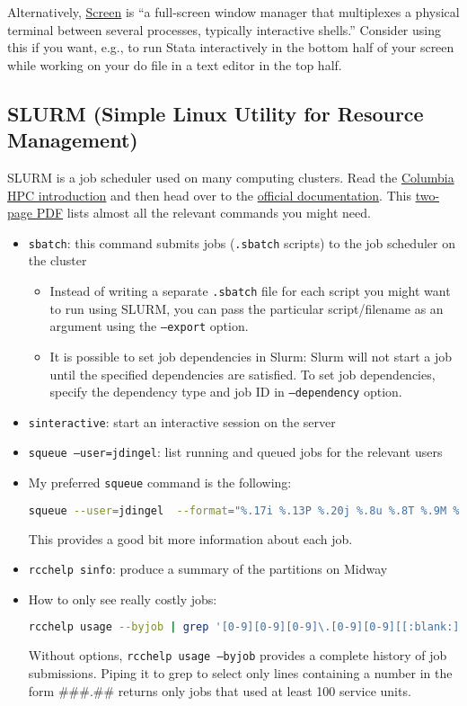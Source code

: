 Alternatively, 
\href{https://www.gnu.org/software/screen/manual/}{Screen} is ``a full-screen window manager that multiplexes a physical terminal between several processes, typically interactive shells.''
Consider using this if you want, e.g., to run Stata interactively in the bottom half of your screen while working on your do file in a text editor in the top half.


\subsection{SLURM (Simple Linux Utility for Resource Management)}

SLURM is a job scheduler used on many computing clusters.
Read the \href{https://columbiauniversity.atlassian.net/wiki/spaces/rcs/pages/62145134/Insomnia+-+Submitting+Jobs}{Columbia HPC introduction} and then head over to the \href{https://slurm.schedmd.com/overview.html}{official documentation}.
This \href{https://slurm.schedmd.com/pdfs/summary.pdf}{two-page PDF} lists almost all the relevant commands you might need.

\begin{itemize}
	\item \texttt{sbatch}: this command submits jobs (\texttt{.sbatch} scripts) to the job scheduler on the cluster
	\begin{itemize}
		\item Instead of writing a separate \texttt{.sbatch} file for each script you might want to run using SLURM, you can pass the particular script/filename as an argument using the \texttt{--export} option.
		\item It is possible to set job dependencies in Slurm: 
		Slurm will not start a job until the specified dependencies are satisfied.
		To set job dependencies, specify the dependency type and job ID in \texttt{--dependency} option.
	\end{itemize}
	\item \texttt{sinteractive}: start an interactive session on the server
	\item \texttt{squeue --user=jdingel}: list running and queued jobs for the relevant users
	\item My preferred \texttt{squeue} command is the following:
	\begin{lstlisting}[language=bash]
	squeue --user=jdingel  --format="%.17i %.13P %.20j %.8u %.8T %.9M %.9l %.6D %R" #jdjobs
	\end{lstlisting}
	This provides a good bit more information about each job.
	\item \texttt{rcchelp sinfo}: produce a summary of the partitions on Midway
	\item How to only see really costly jobs:
	\begin{lstlisting}[language=bash]
	rcchelp usage --byjob | grep '[0-9][0-9][0-9]\.[0-9][0-9][[:blank:]]|'
	\end{lstlisting}
	Without options, \texttt{rcchelp usage --byjob} provides a complete history of job submissions.
	Piping it to grep to select only lines containing a number in the form \#\#\#.\#\# returns only jobs that used at least 100 service units.
\end{itemize}

